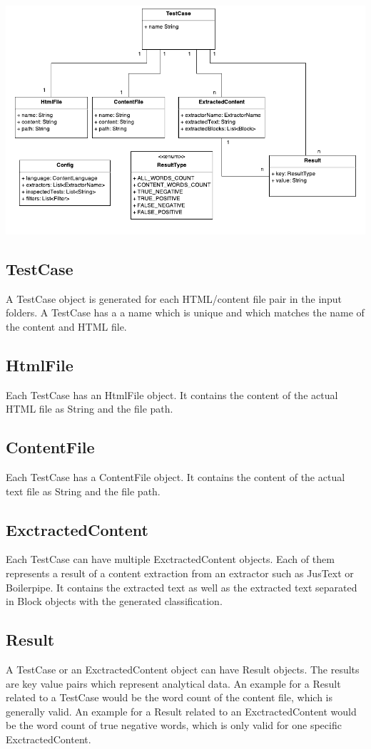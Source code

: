 \includegraphics[width=14cm]{Figures/dataModel.pdf}


\subsection{TestCase}
A TestCase object is generated for each HTML/content file pair in the input folders. A TestCase has a a name which is unique and which matches the name of the content and HTML file.

\subsection{HtmlFile}
Each TestCase has an HtmlFile object. It contains the content of the actual HTML file as String and the file path.

\subsection{ContentFile}
Each TestCase has a ContentFile object. It contains the content of the actual text file as String and the file path.

\subsection{ExctractedContent}
Each TestCase can have multiple ExctractedContent objects. Each of them represents a result of a content extraction from an extractor such as JusText or Boilerpipe. It contains the extracted text as well as the extracted text separated in Block objects with the generated classification.

\subsection{Result}
A TestCase or an ExctractedContent object can have Result objects. The results are key value pairs which represent analytical data. An example for a Result related to a TestCase would be the word count of the content file, which is generally valid. An example for a Result related to an ExctractedContent would be the word count of true negative words, which is only valid for one specific ExctractedContent.

